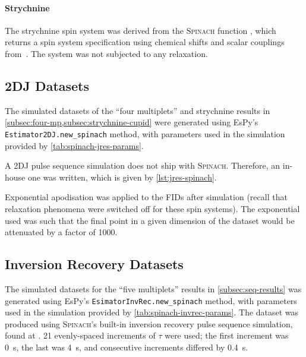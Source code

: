 \paragraph{Strychnine}
The strychnine spin system was derived from
the \textsc{Spinach} function , which returns a
spin system specification using chemical shifts and scalar couplings
from~\cite[Appendix 5]{Berger2004}. The system was not subjected to any relaxation.



\subsection{\acs{2DJ} Datasets}
The simulated datasets of the ``four multiplets'' and strychnine results in
\cref{subsec:four-mp,subsec:strychnine-cupid} were generated
using \ac{EsPy}'s \texttt{Estimator2DJ.new_spinach} method, with
parameters used in the simulation provided by
\cref{tab:spinach-jres-params}.



A \ac{2DJ} pulse sequence simulation does not ship with \textsc{Spinach}.
Therefore, an in-house one was written, which is given by
\cref{lst:jres-spinach}.


Exponential apodisation was applied to the \acp{FID} after simulation
(recall that relaxation phenomena were switched off for these spin systems).
The exponential used was such that the final point in a given dimension of the
dataset would be attenuated by a factor of 1000.

\subsection{Inversion Recovery Datasets}
\label{subsec:invrec-datasets}
The simulated datasets for the ``five multiplets'' results in
\cref{subsec:seq-results} was generated using \ac{EsPy}'s
\texttt{EsimatorInvRec.new_spinach} method, with
parameters used in the simulation provided by
\cref{tab:spinach-invrec-params}.
 The dataset was produced using \textsc{Spinach}'s built-in
inversion recovery pulse sequence simulation, found at
. 21 evenly-spaced increments of
$\tau$ were used; the first increment was \qty{0}{\second}, the last was
\qty{4}{\second}, and consecutive increments differed by \qty{0.4}{\second}.

